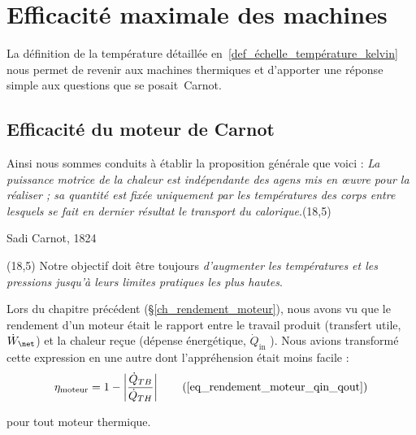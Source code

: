 
\section{Efficacité maximale des machines}
\label{ch_efficacite_maximale_machines}
	
	La définition de la température détaillée en~\ref{def_échelle_température_kelvin} nous permet de revenir aux machines thermiques et d’apporter une réponse simple aux questions que se posait~Carnot.

	\subsection{Efficacité du moteur de Carnot}
	\label{ch_efficacité_moteur_carnot}

			Ainsi nous sommes conduits à établir la proposition générale que voici :
\emph{La puissance motrice de la chaleur est indépendante des agens mis en œuvre pour la réaliser ; sa quantité est fixée uniquement par les températures des corps entre lesquels se fait en dernier résultat le transport du calorique}.\nolinebreak\makebox(18,5){\color{gray}}\par\vspace{-0.3cm}\begin{flushright}Sadi Carnot, 1824~\cite{carnot1824}\end{flushright}
		\makebox(18,5){\color{gray}}
			Notre objectif doit être toujours \emph{d’augmenter les températures et les pressions jusqu’à leurs limites pratiques les plus hautes}.

		Lors du chapitre précédent (\S\ref{ch_rendement_moteur}), nous avons vu que le rendement d’un moteur était le rapport entre le travail produit (transfert utile, $\dot W_\net$) et la chaleur reçue (dépense énergétique, $\dot Q_\text{in}$ ). Nous avions transformé cette expression en une autre dont l’appréhension était moins facile :
		\begin{equation}
			\eta _\text{moteur} = 1 - \left| \frac{\dot Q_{TB}}{\dot Q_{TH}} \right|	\tag{\ref{eq_rendement_moteur_qin_qout}}
		\end{equation}
		\begin{equationterms}
			\item pour tout moteur thermique.
		\end{equationterms}

